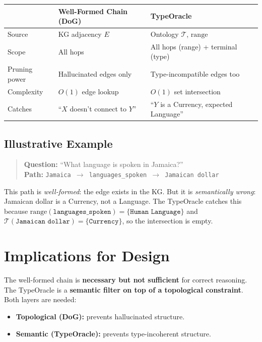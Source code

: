 \documentclass[11pt,a4paper]{article}
\newcommand{\T}{\mathcal{T}}
\newcommand{\range}{\mathrm{range}}
\begin{document}
\begin{center}
\begin{tabular}{@{}lll@{}}
\toprule
  & Well-Formed Chain (DoG) & TypeOracle \\
\midrule
  Source       & KG adjacency $E$ & Ontology $\T$, $\range$ \\
  Scope        & All hops          & All hops (range) + terminal (type) \\
  Pruning power & Hallucinated edges only & Type-incompatible edges too \\
  Complexity   & $O(1)$ edge lookup & $O(1)$ set intersection \\
  Catches      & ``$X$ doesn't connect to $Y$'' & ``$Y$ is a Currency, expected Language'' \\
\bottomrule
\end{tabular}
\end{center}

\subsection{Illustrative Example}

\begin{quote}
\textbf{Question:} ``What language is spoken in Jamaica?''\\[4pt]
\textbf{Path:}
\texttt{Jamaica $\to$ languages\_spoken $\to$ Jamaican dollar}
\end{quote}

This path is \emph{well-formed}: the edge exists in the KG.  But it is
\emph{semantically wrong}: Jamaican dollar is a Currency, not a
Language.  The TypeOracle catches this because
$\range(\texttt{languages\_spoken}) = \{\texttt{Human Language}\}$
and $\T(\texttt{Jamaican dollar}) = \{\texttt{Currency}\}$, so the
intersection is empty.

\section{Implications for Design}

The well-formed chain is \textbf{necessary but not sufficient} for
correct reasoning.  The TypeOracle is a \textbf{semantic filter on top
of a topological constraint}.  Both layers are needed:

\begin{itemize}
  \item \textbf{Topological (DoG):} prevents hallucinated structure.
  \item \textbf{Semantic (TypeOracle):} prevents type-incoherent structure.
\end{itemize}
\end{document}
